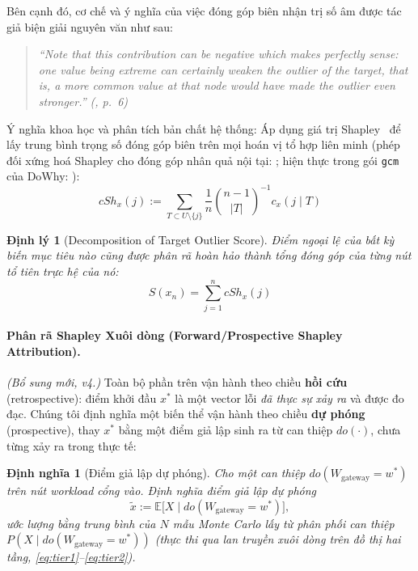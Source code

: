 \documentclass[11pt,a4paper]{article}
\newtheorem{theorem}{Định lý}
\newtheorem{definition}{Định nghĩa}
\begin{document}
Bên cạnh đó, cơ chế và ý nghĩa của việc đóng góp biên nhận trị số âm được tác giả biện giải nguyên văn như sau:
\begin{quote}
\itshape
``Note that this contribution can be negative which makes perfectly sense: one value being extreme can certainly weaken the outlier of the target, that is, a more common value at that node would have made the outlier even stronger.'' (\cite{janzing2019rootcause}, p.~6)
\end{quote}

Ý nghĩa khoa học và phân tích bản chất hệ thống:
Áp dụng giá trị Shapley~\cite{shapley1953} để lấy trung bình trọng số đóng góp biên trên mọi hoán vị tổ hợp liên minh (phép đối xứng hoá Shapley cho đóng góp nhân quả nội tại: \cite{janzing2024icc}; hiện thực trong gói \texttt{gcm} của DoWhy: \cite{blobaum2024dowhy}):
\begin{equation}
cSh_x (j) := \sum_{T \subset U \setminus \{j\}} \frac{1}{n} \binom{n-1}{|T|}^{-1} c_x(j \mid T)
\end{equation}
\begin{theorem}[Decomposition of Target Outlier Score]
Điểm ngoại lệ của bất kỳ biến mục tiêu nào cũng được phân rã hoàn hảo thành tổng đóng góp của từng nút tổ tiên trực hệ của nó:
\begin{equation}
S(x_n) = \sum_{j=1}^n cSh_x(j)
\end{equation}
\end{theorem}

\paragraph{Phân rã Shapley Xuôi dòng (Forward/Prospective Shapley Attribution).}
\label{sec:forward-shapley}
\textit{(Bổ sung mới, v4.)} Toàn bộ phần trên vận hành theo chiều \textbf{hồi cứu} (retrospective): điểm khởi đầu $x^*$ là một vector lỗi \emph{đã thực sự xảy ra} và được đo đạc. Chúng tôi định nghĩa một biến thể vận hành theo chiều \textbf{dự phóng} (prospective), thay $x^*$ bằng một điểm giả lập sinh ra từ can thiệp $do(\cdot)$, chưa từng xảy ra trong thực tế:

\begin{definition}[Điểm giả lập dự phóng]
Cho một can thiệp $do(W_{\text{gateway}} = w^*)$ trên nút workload cổng vào. Định nghĩa điểm giả lập dự phóng
\begin{equation}
\tilde{x} := \mathbb{E}\big[X \mid do(W_{\text{gateway}} = w^*)\big],
\end{equation}
ước lượng bằng trung bình của $N$ mẫu Monte Carlo lấy từ phân phối can thiệp $P(X \mid do(W_{\text{gateway}}=w^*))$ (thực thi qua lan truyền xuôi dòng trên đồ thị hai tầng, \ref{eq:tier1}--\ref{eq:tier2}).
\end{definition}
\end{document}
